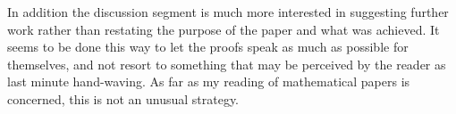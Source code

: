 \documentclass[11pt, a4paper]{article}
\begin{document}
In addition the discussion segment is much more interested in suggesting further work rather than restating the purpose of the paper and what was achieved. It seems to be done this way to let the proofs speak as much as possible for themselves, and not resort to something that may be perceived by the reader as last minute hand-waving. As far as my reading of mathematical papers is concerned, this is not an unusual strategy.



\newpage


\end{document}
